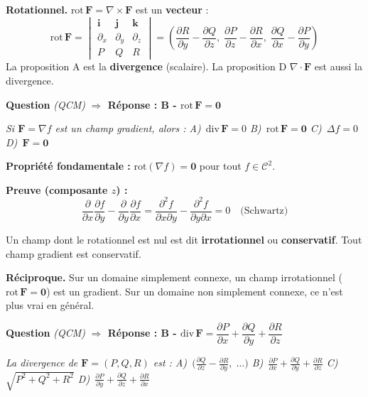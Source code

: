 \documentclass[11pt,a4paper]{article}
\newcounter{qnum}
\newcommand{\qtitre}[2]{%
  \stepcounter{qnum}%
  \medskip\noindent
  \textbf{\color{bleutexte}Question \theqnum}\enspace
  \textit{(#1)}\enspace
  \textcolor{vertok}{\textbf{$\Rightarrow$ Réponse : #2}}
  \par\smallskip
}
\newcommand{\qenonce}[1]{%
  \begin{mdframed}[backgroundcolor=grisbox, linewidth=0pt,
    innerleftmargin=8pt, innerrightmargin=8pt,
    innertopmargin=5pt, innerbottommargin=5pt,
    skipabove=2pt, skipbelow=4pt]
  \small\textit{#1}
  \end{mdframed}
}
\begin{document}
\begin{methodebox}
\textbf{Rotationnel.} $\text{rot}\,\mathbf{F} = \nabla\times\mathbf{F}$ est un \textbf{vecteur} :
$$\text{rot}\,\mathbf{F} = \begin{vmatrix}\mathbf{i}&\mathbf{j}&\mathbf{k}\\\partial_x&\partial_y&\partial_z\\P&Q&R\end{vmatrix}
= \left(\frac{\partial R}{\partial y}-\frac{\partial Q}{\partial z},\;\frac{\partial P}{\partial z}-\frac{\partial R}{\partial x},\;\frac{\partial Q}{\partial x}-\frac{\partial P}{\partial y}\right)$$
La proposition A est la \textbf{divergence} (scalaire). La proposition D $\nabla\cdot\mathbf{F}$ est aussi la divergence.
\end{methodebox}

\qtitre{QCM}{B - $\text{rot}\,\mathbf{F} = \mathbf{0}$}
\qenonce{Si $\mathbf{F}=\nabla f$ est un champ gradient, alors :
\quad A)~$\text{div}\,\mathbf{F}=0$
\quad B)~$\text{rot}\,\mathbf{F}=\mathbf{0}$
\quad C)~$\Delta f = 0$
\quad D)~$\mathbf{F}=\mathbf{0}$}

\begin{methodebox}
\textbf{Propriété fondamentale :} $\text{rot}(\nabla f) = \mathbf{0}$ pour tout $f\in\mathcal{C}^2$.

\textbf{Preuve (composante $z$) :}
$$\frac{\partial}{\partial x}\frac{\partial f}{\partial y} - \frac{\partial}{\partial y}\frac{\partial f}{\partial x} = \frac{\partial^2 f}{\partial x\partial y} - \frac{\partial^2 f}{\partial y\partial x} = 0 \quad \text{(Schwartz)}$$

Un champ dont le rotationnel est nul est dit \textbf{irrotationnel} ou \textbf{conservatif}. Tout champ gradient est conservatif.
\end{methodebox}

\begin{piegebox}
\textbf{Réciproque.} Sur un domaine simplement connexe, un champ irrotationnel ($\text{rot}\,\mathbf{F}=\mathbf{0}$) est un gradient. Sur un domaine non simplement connexe, ce n'est plus vrai en général.
\end{piegebox}

\qtitre{QCM}{B - $\text{div}\,\mathbf{F} = \dfrac{\partial P}{\partial x}+\dfrac{\partial Q}{\partial y}+\dfrac{\partial R}{\partial z}$}
\qenonce{La divergence de $\mathbf{F}=(P,Q,R)$ est :
\quad A)~$\bigl(\frac{\partial Q}{\partial z}-\frac{\partial R}{\partial y},\;\ldots\bigr)$
\quad B)~$\frac{\partial P}{\partial x}+\frac{\partial Q}{\partial y}+\frac{\partial R}{\partial z}$
\quad C)~$\sqrt{P^2+Q^2+R^2}$
\quad D)~$\frac{\partial P}{\partial y}+\frac{\partial Q}{\partial z}+\frac{\partial R}{\partial x}$}
\end{document}
